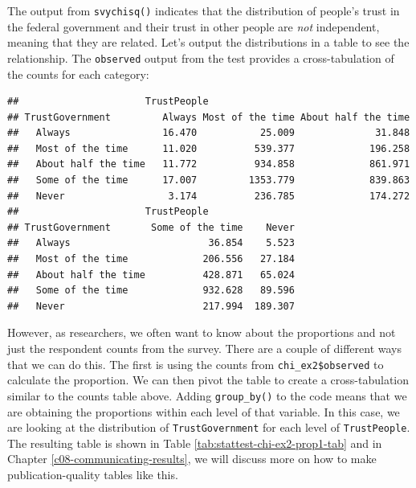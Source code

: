 \documentclass[
]{krantz}
\makeatletter
\newenvironment{Shaded}{\begin{snugshade}}{\end{snugshade}}
\newcommand{\NormalTok}[1]{#1}
\newcommand{\SpecialCharTok}[1]{\textcolor[rgb]{0.43,0.43,0.43}{\textbf{#1}}}
\newenvironment{kframe}{%
\medskip{}
\setlength{\fboxsep}{.8em}
 \def\at@end@of@kframe{}%
 \ifinner\ifhmode%
  \def\at@end@of@kframe{\end{minipage}}%
  \begin{minipage}{\columnwidth}%
 \fi\fi%
 \def\FrameCommand##1{\hskip\@totalleftmargin \hskip-\fboxsep
 \colorbox{shadecolor}{##1}\hskip-\fboxsep
     \hskip-\linewidth \hskip-\@totalleftmargin \hskip\columnwidth}%
 \MakeFramed {\advance\hsize-\width
   \@totalleftmargin\z@ \linewidth\hsize
   \@setminipage}}%
 {\par\unskip\endMakeFramed%
 \at@end@of@kframe}
\renewenvironment{Shaded}{\begin{kframe}}{\end{kframe}}
\makeatother
\begin{document}
The output from \texttt{svychisq()} indicates that the distribution of people's trust in the federal government and their trust in other people are \emph{not} independent, meaning that they are related. Let's output the distributions in a table to see the relationship. The \texttt{observed} output from the test provides a cross-tabulation of the counts for each category:

\begin{Shaded}
\end{Shaded}

\begin{verbatim}
##                      TrustPeople
## TrustGovernment         Always Most of the time About half the time
##   Always                16.470           25.009              31.848
##   Most of the time      11.020          539.377             196.258
##   About half the time   11.772          934.858             861.971
##   Some of the time      17.007         1353.779             839.863
##   Never                  3.174          236.785             174.272
##                      TrustPeople
## TrustGovernment       Some of the time    Never
##   Always                        36.854    5.523
##   Most of the time             206.556   27.184
##   About half the time          428.871   65.024
##   Some of the time             932.628   89.596
##   Never                        217.994  189.307
\end{verbatim}

However, as researchers, we often want to know about the proportions and not just the respondent counts from the survey. There are a couple of different ways that we can do this. The first is using the counts from \texttt{chi\_ex2\$observed} to calculate the proportion. We can then pivot the table to create a cross-tabulation similar to the counts table above. Adding \texttt{group\_by()} to the code means that we are obtaining the proportions within each level of that variable. In this case, we are looking at the distribution of \texttt{TrustGovernment} for each level of \texttt{TrustPeople}. The resulting table is shown in Table \ref{tab:stattest-chi-ex2-prop1-tab} and in Chapter \ref{c08-communicating-results}, we will discuss more on how to make publication-quality tables like this.
\end{document}
